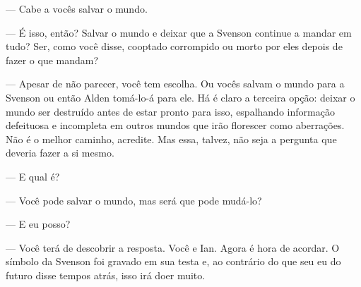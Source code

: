 --- Cabe a vocês salvar o mundo.

--- É isso, então? Salvar o mundo e deixar que a Svenson continue a mandar em
tudo? Ser, como você disse, cooptado corrompido ou morto por eles depois de
fazer o que mandam?

--- Apesar de não parecer, você tem escolha. Ou vocês salvam o mundo para a
Svenson ou então Alden tomá-lo-á para ele. Há é claro a terceira opção: deixar
o mundo ser destruído antes de estar pronto para isso, espalhando informação
defeituosa e incompleta em outros mundos que irão florescer como aberrações.
Não é o melhor caminho, acredite. Mas essa, talvez, não seja a pergunta que
deveria fazer a si mesmo.

--- E qual é?

--- Você pode salvar o mundo, mas será que pode mudá-lo?

--- E eu posso?

--- Você terá de descobrir a resposta. Você e Ian. Agora é hora de acordar. O
símbolo da Svenson foi gravado em sua testa e, ao contrário do que seu eu do
futuro disse tempos atrás, isso irá doer muito.
